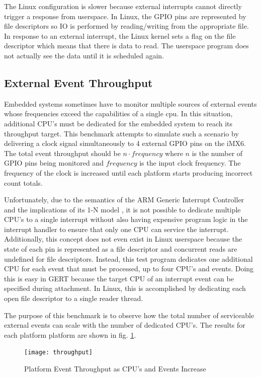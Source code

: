 The Linux configuration is slower because external interrupts cannot directly trigger a response
from userspace. In Linux, the GPIO pins are represented by file descriptors so
IO is performed by reading/writing from the appropriate file. In response to an external interrupt,
the Linux kernel sets a flag on the file descriptor which means that there is data to read. The userspace
program does not actually see the data until it is scheduled again.

\subsection{External Event Throughput} \label{sec:thruput}
Embedded systems sometimes have to monitor multiple sources of external events
whose frequencies exceed the capabilities of a single cpu. In this situation,
additional CPU's must be dedicated for the embedded system to reach its throughput
target. This benchmark attempts to simulate such a scenario by delivering a clock
signal simultaneously to 4 external GPIO pins on the iMX6. The total event throughput
should be $n \cdot frequency$ where $n$ is the number of GPIO pins being monitored and
$frequency$ is the input clock frequency. The frequency of the clock is
increased until each platform starts producing incorrect count totals.

Unfortunately, due to the semantics of the ARM Generic Interrupt Controller and the implications of its 1-N model \cite{gic},
it is not possible to dedicate
multiple CPU's to a single interrupt without also having expensive program logic in the interrupt handler to ensure that
only one CPU can service the interrupt. Additionally, this concept does not even exist in Linux userspace
because the state of each pin is represented as a file descriptor and concurrent reads are undefined for file descriptors.
Instead, this test program dedicates one additional CPU for each event that must be processed, up to four CPU's and events.
Doing this is easy in GERT because the target CPU of an interrupt event can be specified during attachment.
In Linux, this is accomplished by dedicating each open file descriptor to a single reader thread.

The purpose of this benchmark is to observe how the total number of serviceable external events can scale
with the number of dedicated CPU's. The results for each platform platform are shown in fig. \ref{fig:thrugraph}.

\begin{figure}[h]
\begin{center}
  \texttt{[image: throughput]}
\end{center}
  \caption{Platform Event Throughput as CPU's and Events Increase} \label{fig:thrugraph}
\end{figure}

